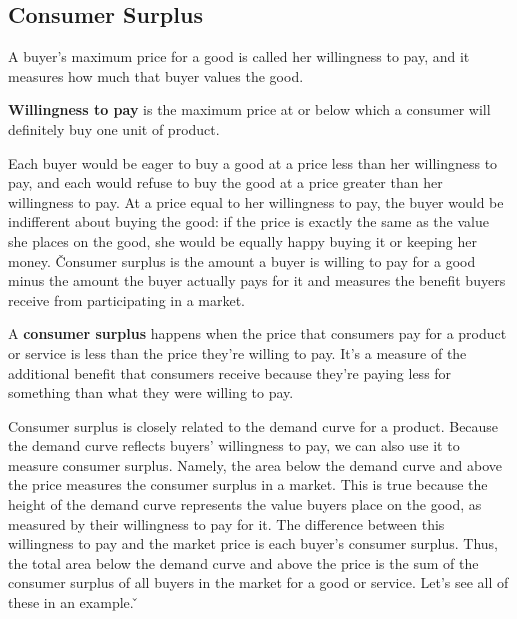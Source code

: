 \subsection{Consumer Surplus}

A buyer's maximum price for a good is called her willingness to pay, and it measures how much that buyer values the
good.

\textbf{Willingness to pay} is the maximum price at or below which a consumer will definitely buy one unit of product.
\ed

Each buyer would be eager to buy a good at a price less than her willingness to pay, and each would refuse to buy the
good at a price greater than her willingness to pay. At a price equal to her willingness to pay, the buyer would be
indifferent about buying the good: if the price is exactly the same as the value she places on the good, she would be
equally happy buying it or keeping her money. \v

Consumer surplus is the amount a buyer is willing to pay for a good minus the amount the buyer actually pays for it
and measures the benefit buyers receive from participating in a market.

A \textbf{consumer surplus} happens when the price that consumers pay for a product or service is less than the price
they're willing to pay. It's a measure of the additional benefit that consumers receive because they're paying less
for something than what they were willing to pay.
\ed

Consumer surplus is closely related to the demand curve for a product. Because the demand curve reflects buyers'
willingness to pay, we can also use it to measure consumer surplus. Namely, the area below the demand curve and above
the price measures the consumer surplus in a market. This is true because the height of the demand curve represents
the value buyers place on the good, as measured by their willingness to pay for it. The difference between this
willingness to pay and the market price is each buyer's consumer surplus. Thus, the total area below the demand curve
and above the price is the sum of the consumer surplus of all buyers in the market for a good or service. Let's see
all of these in an example. \v

